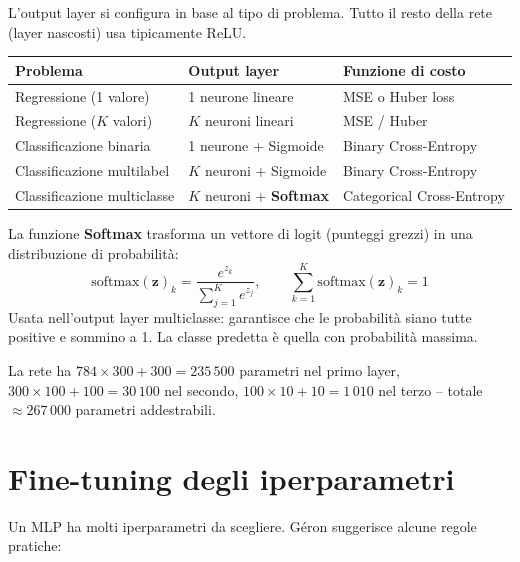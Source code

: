 L'output layer si configura in base al tipo di problema. Tutto il resto della rete (layer nascosti) usa tipicamente ReLU.

\begin{center}
\renewcommand{\arraystretch}{1.4}
\begin{tabular}{@{} l p{3.8cm} p{5.2cm} @{}}
\toprule
\textbf{Problema} & \textbf{Output layer} & \textbf{Funzione di costo} \\
\midrule
Regressione (1 valore) & 1 neurone lineare & MSE o Huber loss \\
Regressione ($K$ valori) & $K$ neuroni lineari & MSE / Huber \\
Classificazione binaria & 1 neurone + Sigmoide & Binary Cross-Entropy \\
Classificazione multilabel & $K$ neuroni + Sigmoide & Binary Cross-Entropy \\
Classificazione multiclasse & $K$ neuroni + \textbf{Softmax} & Categorical Cross-Entropy \\
\bottomrule
\end{tabular}
\end{center}

\begin{defbox}[Softmax]
La funzione \textbf{Softmax} trasforma un vettore di logit (punteggi grezzi) in una distribuzione di probabilità:
\[
\text{softmax}(\mathbf{z})_k = \frac{e^{z_k}}{\displaystyle\sum_{j=1}^{K} e^{z_j}}, \qquad \sum_{k=1}^{K} \text{softmax}(\mathbf{z})_k = 1
\]
Usata nell'output layer multiclasse: garantisce che le probabilità siano tutte positive e sommino a 1. La classe predetta è quella con probabilità massima.
\end{defbox}

\begin{exbox}
La rete ha $784 \times 300 + 300 = 235\,500$ parametri nel primo layer, $300 \times 100 + 100 = 30\,100$ nel secondo, $100 \times 10 + 10 = 1\,010$ nel terzo -- totale $\approx 267\,000$ parametri addestrabili.
\end{exbox}

\section{Fine-tuning degli iperparametri}

Un MLP ha molti iperparametri da scegliere. Géron suggerisce alcune regole pratiche:


